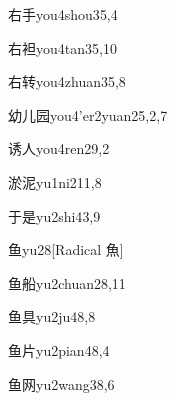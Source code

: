 \begin{verbete}{右手}{you4shou3}{5,4}
\end{verbete}

\begin{verbete}{右袒}{you4tan3}{5,10}
\end{verbete}

\begin{verbete}{右转}{you4zhuan3}{5,8}
\end{verbete}

\begin{verbete}{幼儿园}{you4'er2yuan2}{5,2,7}
\end{verbete}

\begin{verbete}{诱人}{you4ren2}{9,2}
\end{verbete}

\begin{verbete}{淤泥}{yu1ni2}{11,8}
\end{verbete}

\begin{verbete}{于是}{yu2shi4}{3,9}
\end{verbete}

\begin{verbete}{鱼}{yu2}{8}[Radical 魚]
\end{verbete}

\begin{verbete}{鱼船}{yu2chuan2}{8,11}
\end{verbete}

\begin{verbete}{鱼具}{yu2ju4}{8,8}
\end{verbete}

\begin{verbete}{鱼片}{yu2pian4}{8,4}
\end{verbete}

\begin{verbete}{鱼网}{yu2wang3}{8,6}
\end{verbete}

